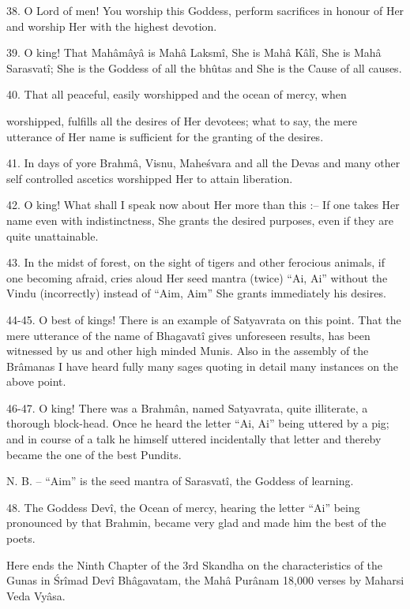 38. O Lord of men! You worship this Goddess, perform sacrifices in honour of Her and worship Her with the highest devotion.

39. O king! That Mah\^am\^ay\^a is Mah\^a Laksm\^i, She is Mah\^a K\^al\^i, She is Mah\^a Sarasvat\^i; She is the Goddess of all the bhûtas and She is the Cause of all causes.

40. That all peaceful, easily worshipped and the ocean of mercy, when

worshipped, fulfills all the desires of Her devotees; what to say, the mere utterance of Her name is sufficient for the granting of the desires.

41. In days of yore Brahm\^a, Visnu, Mahe\'svara and all the Devas and many other self controlled ascetics worshipped Her to attain liberation.

42. O king! What shall I speak now about Her more than this :-- If one takes Her name even with indistinctness, She grants the desired purposes, even if they are quite unattainable.

43. In the midst of forest, on the sight of tigers and other ferocious animals, if one becoming afraid, cries aloud Her seed mantra (twice) ``Ai, Ai'' without the Vindu (incorrectly) instead of ``Aim, Aim'' She grants immediately his desires.

44-45. O best of kings! There is an example of Satyavrata on this point. That the mere utterance of the name of Bhagavat\^i gives unforeseen results, has been witnessed by us and other high minded Munis. Also in the assembly of the Br\^amanas I have heard fully many sages quoting in detail many instances on the above point.

46-47. O king! There was a Brahm\^an, named Satyavrata, quite illiterate, a thorough block-head. Once he heard the letter ``Ai, Ai'' being uttered by a pig; and in course of a talk he himself uttered incidentally that letter and thereby became the one of the best Pundits.

N. B. – ``Aim'' is the seed mantra of Sarasvat\^i, the Goddess of learning.

48. The Goddess Dev\^i, the Ocean of mercy, hearing the letter ``Ai'' being pronounced by that Brahmin, became very glad and made him the best of the poets.

Here ends the Ninth Chapter of the 3rd Skandha on the characteristics of the Gunas in \'Sr\^imad Dev\^i Bh\^agavatam, the Mah\^a Pur\^anam 18,000 verses by Maharsi Veda Vy\^asa.